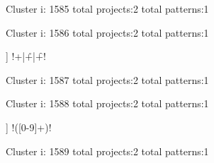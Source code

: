 Cluster i: 1585
total projects:2
total patterns:1
\begin{multicols}{1}
\end{multicols}







Cluster i: 1586
total projects:2
total patterns:1
\begin{multicols}{1}
\begin{description}[noitemsep,topsep=0pt]
\item [[2] ] \cverb!\n+|\r+|\f+!
\end{description}
\end{multicols}







Cluster i: 1587
total projects:2
total patterns:1
\begin{multicols}{1}
\end{multicols}







Cluster i: 1588
total projects:2
total patterns:1
\begin{multicols}{1}
\begin{description}[noitemsep,topsep=0pt]
\item [[2] ] \cverb!\*\*([0-9]+)!
\end{description}
\end{multicols}







Cluster i: 1589
total projects:2
total patterns:1
\begin{multicols}{1}
\begin{description}[noitemsep,topsep=0pt]
\item [[2] ] \cverb![$><;[{~`|&()]!
\end{description}
\end{multicols}







